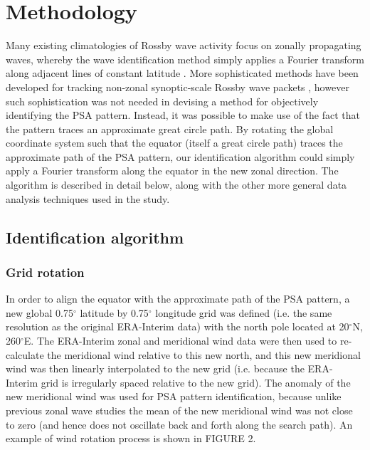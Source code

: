 \section{Methodology}

Many existing climatologies of Rossby wave activity focus on zonally propagating waves, whereby the wave identification method simply applies a Fourier transform along adjacent lines of constant latitude \citep[e.g.][]{Glatt2014,IrvingSimmonds2015}. More sophisticated methods have been developed for tracking non-zonal synoptic-scale Rossby wave packets \citep[e.g.][]{Zimin2006,Souders2014}, however such sophistication was not needed in devising a method for objectively identifying the PSA pattern. Instead, it was possible to make use of the fact that the pattern traces an approximate great circle path. By rotating the global coordinate system such that the equator (itself a great circle path) traces the approximate path of the PSA pattern, our identification algorithm could simply apply a Fourier transform along the equator in the new zonal direction. The algorithm is described in detail below, along with the other more general data analysis techniques used in the study.

\subsection{Identification algorithm}

\subsubsection{Grid rotation}

In order to align the equator with the approximate path of the PSA pattern, a new global 0.75$^{\circ}$ latitude by 0.75$^{\circ}$ longitude grid was defined (i.e. the same resolution as the original ERA-Interim data) with the north pole located at 20$^{\circ}$N, 260$^{\circ}$E. The ERA-Interim zonal and meridional wind data were then used to re-calculate the meridional wind relative to this new north, and this new meridional wind was then linearly interpolated to the new grid (i.e. because the ERA-Interim grid is irregularly spaced relative to the new grid). The anomaly of the new meridional wind was used for PSA pattern identification, because unlike previous zonal wave studies \citep[e.g.][]{IrvingSimmonds2015} the mean of the new meridional wind was not close to zero (and hence does not oscillate back and forth along the search path). An example of wind rotation process is shown in FIGURE 2. 


